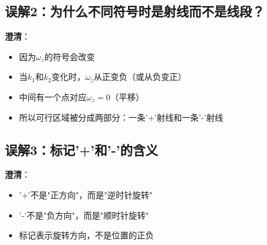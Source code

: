 \documentclass[12pt,a4paper]{article}
\begin{document}
\subsection{误解2：为什么不同符号时是射线而不是线段？}

\textbf{澄清}：
\begin{itemize}
\item 因为$\omega_z$的符号会改变
\item 当$k_1$和$k_2$变化时，$\omega_z$从正变负（或从负变正）
\item 中间有一个点对应$\omega_z = 0$（平移）
\item 所以可行区域被分成两部分：一条'+'射线和一条'-'射线
\end{itemize}

\subsection{误解3：标记'+'和'-'的含义}

\textbf{澄清}：
\begin{itemize}
\item '+'不是"正方向"，而是"逆时针旋转"
\item '-'不是"负方向"，而是"顺时针旋转"
\item 标记表示旋转方向，不是位置的正负
\end{itemize}
\end{document}
